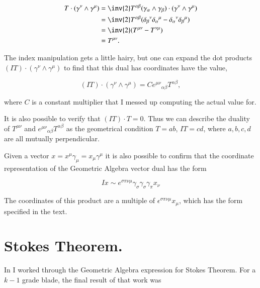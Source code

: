 \begin{align*}
T \cdot (\gamma^\nu \wedge \gamma^\mu)
&= 
\inv{2} T^{\alpha \beta} (\gamma_\alpha \wedge \gamma_\beta ) \cdot (\gamma^\nu \wedge \gamma^\mu) \\
&= 
\inv{2} T^{\alpha \beta} ( {\delta_\beta}^\nu {\delta_\alpha}^\mu -{\delta_\alpha}^\nu {\delta_\beta}^\mu ) \\
&= 
\inv{2} (T^{\mu \nu} - T^{\nu \mu}) \\
&= 
T^{\mu \nu}.
\end{align*}

The index manipulation gets a little hairy, but one can expand the dot products $(I T) \cdot (\gamma^\nu \wedge \gamma^\mu)$ to find that this dual has coordinates have the value,

\begin{equation}\label{eqn:antisymmetricTensorTx:530}
(I T) \cdot (\gamma^\nu \wedge \gamma^\mu) = C {e^{\mu \nu}}_{\alpha \beta} T^{\alpha \beta},
\end{equation}

where $C$ is a constant multiplier that I messed up computing the actual value for.

It is also possible to verify that $(IT) \cdot T = 0$.  Thus we can describe the duality of $T^{\mu \nu}$ and ${e^{\mu \nu}}_{\alpha \beta} T^{\alpha \beta}$ as the geometrical condition $T = a b$, $IT = c d$, where $a, b, c, d$ are all mutually perpendicular.

Given a vector $x = x^\mu \gamma_\mu = x_\mu \gamma^\mu$ it is also possible to confirm that the coordinate representation of the Geometric Algebra vector dual has the form

\begin{equation}\label{eqn:antisymmetricTensorTx:540}
I x \sim e^{\sigma \pi \nu \mu} \gamma_\sigma \gamma_\sigma \gamma_\pi x_\nu
\end{equation}

The coordinates of this product are a multiple of $\epsilon^{\sigma \pi \nu \mu } x_\mu$, which has the form specified in the text.

\section{Stokes Theorem.}

In \citep{gabook:stokesNoTensor} I worked through the Geometric Algebra expression for Stokes Theorem.  For a $k-1$ grade blade, the final result of that work was


